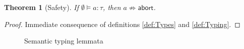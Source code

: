 \documentclass[12pt,a4paper]{article}
\theoremstyle{definition}
\theoremstyle{plain}
\newtheorem{theorem}{Theorem}
\newcommand{\abort}{\ensuremath{\mathsf{abort}}}
\newcommand{\abstr}[2]{\ensuremath{\lambda{#1}.\,{#2}}}
\newcommand{\app}[2]{\ensuremath{{#1}\,{#2}}}
\newcommand{\Nat}{\ensuremath{\mathsf{Nat}}}
\begin{document}
\begin{theorem}[Safety]
  If $\emptyset \models a : \tau$, then $a \not\Rightarrow \abort$.
\end{theorem}

\begin{proof}
  Immediate consequence of definitions \ref{def:Types} and \ref{def:Typing}.
\end{proof}

\begin{figure}[htb]
  \centering
  \caption{Semantic typing lemmata}
  \label{fig:Semantic_typing_lemmata}
\end{figure}




\end{document}
